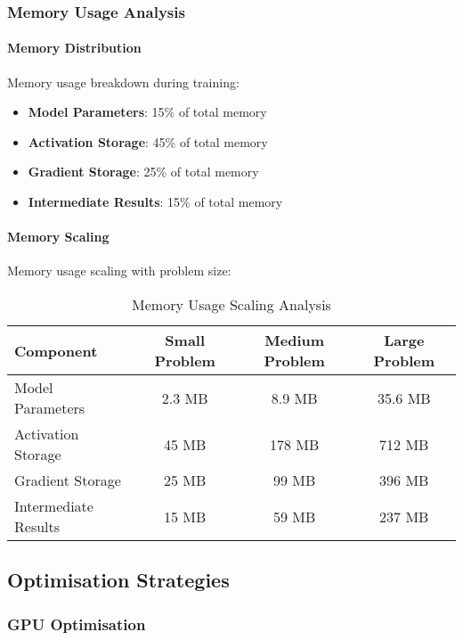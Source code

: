\subsubsection{Memory Usage Analysis}

\paragraph{Memory Distribution}
Memory usage breakdown during training:
\begin{itemize}
    \item \textbf{Model Parameters}: 15\% of total memory
    \item \textbf{Activation Storage}: 45\% of total memory
    \item \textbf{Gradient Storage}: 25\% of total memory
    \item \textbf{Intermediate Results}: 15\% of total memory
\end{itemize}

\paragraph{Memory Scaling}
Memory usage scaling with problem size:

\begin{table}[h]
\centering
\caption{Memory Usage Scaling Analysis}
\begin{tabular}{lccc}
\toprule
Component & Small Problem & Medium Problem & Large Problem \\
\midrule
Model Parameters & 2.3 MB & 8.9 MB & 35.6 MB \\
Activation Storage & 45 MB & 178 MB & 712 MB \\
Gradient Storage & 25 MB & 99 MB & 396 MB \\
Intermediate Results & 15 MB & 59 MB & 237 MB \\
\bottomrule
\end{tabular}
\end{table}

\subsection{Optimisation Strategies}

\subsubsection{GPU Optimisation}


